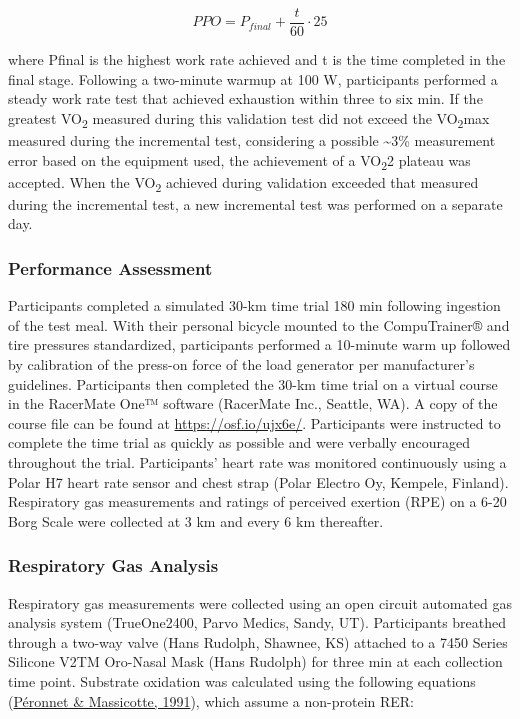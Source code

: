\documentclass[]{cik}%
\begin{document}
\[
PPO=P_{final}+\frac{t}{60} \cdot 25
\]

where Pfinal is the highest work rate achieved and t is the time
completed in the final stage. Following a two-minute warmup at 100 W,
participants performed a steady work rate test that achieved exhaustion
within three to six min. If the greatest VO\textsubscript{2} measured
during this validation test did not exceed the VO\textsubscript{2}max
measured during the incremental test, considering a possible
\textasciitilde3\% measurement error based on the equipment used, the
achievement of a VO\textsubscript{2}2 plateau was accepted. When the
VO\textsubscript{2} achieved during validation exceeded that measured
during the incremental test, a new incremental test was performed on a
separate day.

\hypertarget{performance-assessment}{%
\subsubsection{Performance Assessment}\label{performance-assessment}}

Participants completed a simulated 30-km time trial 180 min following
ingestion of the test meal. With their personal bicycle mounted to the
CompuTrainer® and tire pressures standardized, participants performed a
10-minute warm up followed by calibration of the press-on force of the
load generator per manufacturer's guidelines. Participants then
completed the 30-km time trial on a virtual course in the RacerMate One™
software (RacerMate Inc., Seattle, WA). A copy of the course file can be
found at \url{https://osf.io/ujx6e/}. Participants were instructed to
complete the time trial as quickly as possible and were verbally
encouraged throughout the trial. Participants' heart rate was monitored
continuously using a Polar H7 heart rate sensor and chest strap (Polar
Electro Oy, Kempele, Finland). Respiratory gas measurements and ratings
of perceived exertion (RPE) on a 6-20 Borg Scale were collected at 3 km
and every 6 km thereafter.

\hypertarget{respiratory-gas-analysis}{%
\subsubsection{Respiratory Gas
Analysis}\label{respiratory-gas-analysis}}

Respiratory gas measurements were collected using an open circuit
automated gas analysis system (TrueOne2400, Parvo Medics, Sandy, UT).
Participants breathed through a two-way valve (Hans Rudolph, Shawnee,
KS) attached to a 7450 Series Silicone V2TM Oro-Nasal Mask (Hans
Rudolph) for three min at each collection time point. Substrate
oxidation was calculated using the following equations
(\protect\hyperlink{ref-43}{Péronnet \& Massicotte, 1991}), which assume
a non-protein RER:
\end{document}
